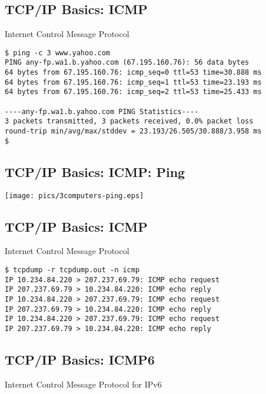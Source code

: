 \documentclass[xga]{xdvislides}
\begin{document}
\subsection{TCP/IP Basics: ICMP}
\begin{center}
Internet Control Message Protocol
\end{center}
\vspace{.2in}

\begin{verbatim}
$ ping -c 3 www.yahoo.com
PING any-fp.wa1.b.yahoo.com (67.195.160.76): 56 data bytes
64 bytes from 67.195.160.76: icmp_seq=0 ttl=53 time=30.888 ms
64 bytes from 67.195.160.76: icmp_seq=1 ttl=53 time=23.193 ms
64 bytes from 67.195.160.76: icmp_seq=2 ttl=53 time=25.433 ms

----any-fp.wa1.b.yahoo.com PING Statistics----
3 packets transmitted, 3 packets received, 0.0% packet loss
round-trip min/avg/max/stddev = 23.193/26.505/30.888/3.958 ms
$
\end{verbatim}
\vspace{.25in}

\subsection{TCP/IP Basics: ICMP: Ping}
\vspace*{\fill}
\begin{center}
	\texttt{[image: pics/3computers-ping.eps]}
\end{center}
\vspace*{\fill}


\subsection{TCP/IP Basics: ICMP}
\begin{center}
Internet Control Message Protocol
\end{center}
\vspace{.2in}

\begin{verbatim}
$ tcpdump -r tcpdump.out -n icmp
IP 10.234.84.220 > 207.237.69.79: ICMP echo request
IP 207.237.69.79 > 10.234.84.220: ICMP echo reply
IP 10.234.84.220 > 207.237.69.79: ICMP echo request
IP 207.237.69.79 > 10.234.84.220: ICMP echo reply
IP 10.234.84.220 > 207.237.69.79: ICMP echo request
IP 207.237.69.79 > 10.234.84.220: ICMP echo reply
\end{verbatim}


\subsection{TCP/IP Basics: ICMP6}
\begin{center}
Internet Control Message Protocol for IPv6
\end{center}
\vspace{.2in}
\end{document}
